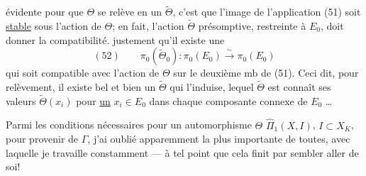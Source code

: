 évidente pour que $\Theta$ se relève en un $\widetilde{\Theta}$, c'est que l'image de l'application (51) soit \uline{stable} sous l'action de $\Theta$; en fait, l'action $\widetilde{\Theta}$ présomptive, restreinte à $E_0$, doit donner la compatibilité.      justement qu'il existe une \deleted{$\unsure{\widetilde{\Theta}}$} 
\[
(52)\qquad \pi_0(\widetilde{\Theta}_0):\pi_0(E_0)\overset{\sim}{\longrightarrow}\pi_0(E_0)
\]
 qui soit compatible avec l'action de $\Theta$ sur le deuxième mb de (51). Ceci dit, pour  relèvement, il existe bel  et bien un $\widetilde{\Theta}$ qui l'induise, lequel $\widetilde{\Theta}$ est   connaît ses valeurs $\widetilde{\Theta}(x_i)$  pour \uline{un} $x_i\in E_0$ dans chaque composante connexe de $E_0$ \ldots

Parmi les conditions nécessaires  pour un automorphisme $\Theta$  $\widehat{\Pi}_1(X,I)$, $I\subset X_K$, pour provenir de $\Gamma$, j'ai oublié apparemment la plus importante de toutes, avec laquelle je travaille  constamment --- à tel point que cela finit par sembler aller de soi!
